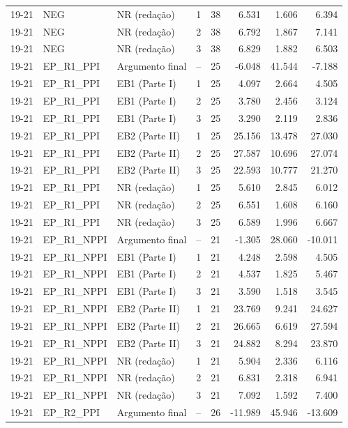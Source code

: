 \begin{longtable}{lllcrrrr}
19-21 & NEG & NR (redação) & 1 & 38 & 6.531 & 1.606 & 6.394 \\
19-21 & NEG & NR (redação) & 2 & 38 & 6.792 & 1.867 & 7.141 \\
19-21 & NEG & NR (redação) & 3 & 38 & 6.829 & 1.882 & 6.503 \\
19-21 & EP\_R1\_PPI & Argumento final & -- & 25 & -6.048 & 41.544 & -7.188 \\
19-21 & EP\_R1\_PPI & EB1 (Parte I) & 1 & 25 & 4.097 & 2.664 & 4.505 \\
19-21 & EP\_R1\_PPI & EB1 (Parte I) & 2 & 25 & 3.780 & 2.456 & 3.124 \\
19-21 & EP\_R1\_PPI & EB1 (Parte I) & 3 & 25 & 3.290 & 2.119 & 2.836 \\
19-21 & EP\_R1\_PPI & EB2 (Parte II) & 1 & 25 & 25.156 & 13.478 & 27.030 \\
19-21 & EP\_R1\_PPI & EB2 (Parte II) & 2 & 25 & 27.587 & 10.696 & 27.074 \\
19-21 & EP\_R1\_PPI & EB2 (Parte II) & 3 & 25 & 22.593 & 10.777 & 21.270 \\
19-21 & EP\_R1\_PPI & NR (redação) & 1 & 25 & 5.610 & 2.845 & 6.012 \\
19-21 & EP\_R1\_PPI & NR (redação) & 2 & 25 & 6.551 & 1.608 & 6.160 \\
19-21 & EP\_R1\_PPI & NR (redação) & 3 & 25 & 6.589 & 1.996 & 6.667 \\
19-21 & EP\_R1\_NPPI & Argumento final & -- & 21 & -1.305 & 28.060 & -10.011 \\
19-21 & EP\_R1\_NPPI & EB1 (Parte I) & 1 & 21 & 4.248 & 2.598 & 4.505 \\
19-21 & EP\_R1\_NPPI & EB1 (Parte I) & 2 & 21 & 4.537 & 1.825 & 5.467 \\
19-21 & EP\_R1\_NPPI & EB1 (Parte I) & 3 & 21 & 3.590 & 1.518 & 3.545 \\
19-21 & EP\_R1\_NPPI & EB2 (Parte II) & 1 & 21 & 23.769 & 9.241 & 24.627 \\
19-21 & EP\_R1\_NPPI & EB2 (Parte II) & 2 & 21 & 26.665 & 6.619 & 27.594 \\
19-21 & EP\_R1\_NPPI & EB2 (Parte II) & 3 & 21 & 24.882 & 8.294 & 23.870 \\
19-21 & EP\_R1\_NPPI & NR (redação) & 1 & 21 & 5.904 & 2.336 & 6.116 \\
19-21 & EP\_R1\_NPPI & NR (redação) & 2 & 21 & 6.831 & 2.318 & 6.941 \\
19-21 & EP\_R1\_NPPI & NR (redação) & 3 & 21 & 7.092 & 1.592 & 7.400 \\
19-21 & EP\_R2\_PPI & Argumento final & -- & 26 & -11.989 & 45.946 & -13.609 \\

\end{longtable}
